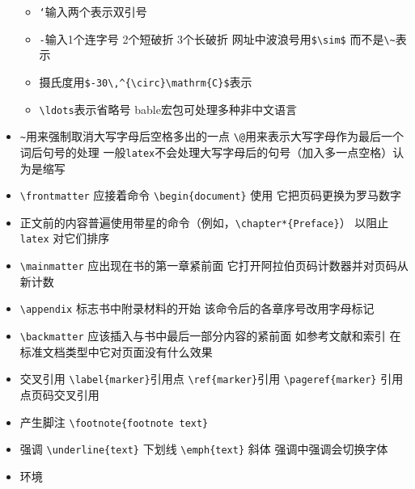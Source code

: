 \documentclass[]{book}
\begin{document}
\begin{itemize}
  \begin{itemize}
  \item
    \texttt{‘}输入两个表示双引号
  \item
    \texttt{-}输入1个连字号 2个短破折 3个长破折 网址中波浪号用\texttt{\$\textbackslash{}sim\$} 而不是\texttt{\textbackslash{}\textasciitilde{}}表示
  \item
    摄氏度用\texttt{\$-30\textbackslash{},\^{}\{\textbackslash{}circ\}\textbackslash{}mathrm\{C\}\$}表示
  \item
    \texttt{\textbackslash{}ldots}表示省略号 bable宏包可处理多种非中文语言
  \end{itemize}
\item
  \texttt{\textasciitilde{}}用来强制取消大写字母后空格多出的一点 \texttt{\textbackslash{}@}用来表示大写字母作为最后一个词后句号的处理 一般\texttt{latex}不会处理大写字母后的句号（加入多一点空格）认为是缩写
\item
  \texttt{\textbackslash{}frontmatter} 应接着命令 \texttt{\textbackslash{}begin\{document\}} 使用 它把页码更换为罗马数字
\item
  正文前的内容普遍使用带星的命令（例如，\texttt{\textbackslash{}chapter*\{Preface\}}） 以阻止 \texttt{latex} 对它们排序
\item
  \texttt{\textbackslash{}mainmatter} 应出现在书的第一章紧前面 它打开阿拉伯页码计数器并对页码从新计数
\item
  \texttt{\textbackslash{}appendix} 标志书中附录材料的开始 该命令后的各章序号改用字母标记
\item
  \texttt{\textbackslash{}backmatter} 应该插入与书中最后一部分内容的紧前面 如参考文献和索引 在标准文档类型中它对页面没有什么效果
\item
  交叉引用 \texttt{\textbackslash{}label\{marker\}}引用点 \texttt{\textbackslash{}ref\{marker\}}引用 \texttt{\textbackslash{}pageref\{marker\}} 引用点页码交叉引用
\item
  产生脚注 \texttt{\textbackslash{}footnote\{footnote\ text\}}
\item
  强调 \texttt{\textbackslash{}underline\{text\}} 下划线 \texttt{\textbackslash{}emph\{text\}} 斜体 强调中强调会切换字体
\item
  环境


\end{itemize}
\end{document}

